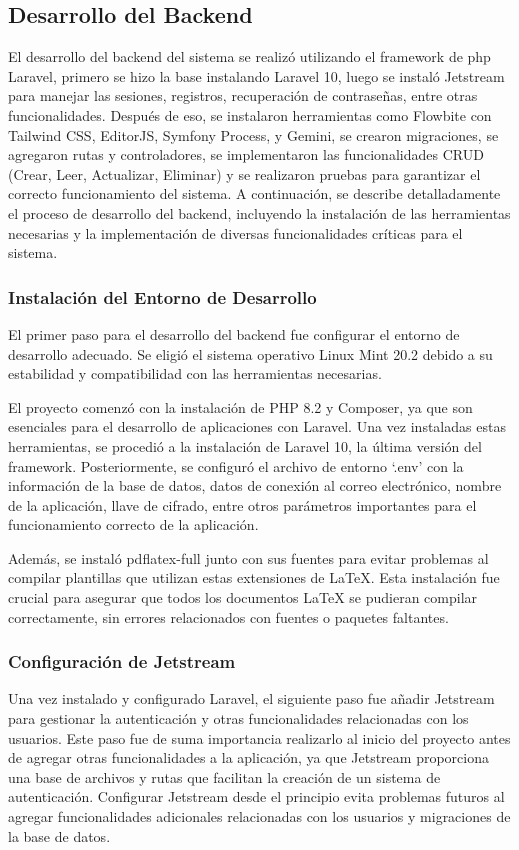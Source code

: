 \subsection{Desarrollo del Backend}
El desarrollo del backend del sistema se realizó utilizando el framework de php Laravel, primero se hizo la base instalando Laravel 10, luego se instaló Jetstream para manejar las sesiones, registros, recuperación de contraseñas, entre otras funcionalidades. Después de eso, se instalaron herramientas como Flowbite con Tailwind CSS, EditorJS, Symfony Process, y Gemini, se crearon migraciones, se agregaron rutas y controladores, se implementaron las funcionalidades CRUD (Crear, Leer, Actualizar, Eliminar) y se realizaron pruebas para garantizar el correcto funcionamiento del sistema. A continuación, se describe detalladamente el proceso de desarrollo del backend, incluyendo la instalación de las herramientas necesarias y la implementación de diversas funcionalidades críticas para el sistema.

\subsubsection{Instalación del Entorno de Desarrollo}
El primer paso para el desarrollo del backend fue configurar el entorno de desarrollo adecuado. Se eligió el sistema operativo Linux Mint 20.2 debido a su estabilidad y compatibilidad con las herramientas necesarias.

El proyecto comenzó con la instalación de PHP 8.2 y Composer, ya que son esenciales para el desarrollo de aplicaciones con Laravel. Una vez instaladas estas herramientas, se procedió a la instalación de Laravel 10, la última versión del framework. Posteriormente, se configuró el archivo de entorno `.env' con la información de la base de datos, datos de conexión al correo electrónico, nombre de la aplicación, llave de cifrado, entre otros parámetros importantes para el funcionamiento correcto de la aplicación.

Además, se instaló pdflatex-full junto con sus fuentes para evitar problemas al compilar plantillas que utilizan estas extensiones de LaTeX. Esta instalación fue crucial para asegurar que todos los documentos LaTeX se pudieran compilar correctamente, sin errores relacionados con fuentes o paquetes faltantes.


\subsubsection{Configuración de Jetstream}
Una vez instalado y configurado Laravel, el siguiente paso fue añadir Jetstream para gestionar la autenticación y otras funcionalidades relacionadas con los usuarios. Este paso fue de suma importancia realizarlo al inicio del proyecto antes de agregar otras funcionalidades a la aplicación, ya que Jetstream proporciona una base de archivos y rutas que facilitan la creación de un sistema de autenticación. Configurar Jetstream desde el principio evita problemas futuros al agregar funcionalidades adicionales relacionadas con los usuarios y migraciones de la base de datos.

